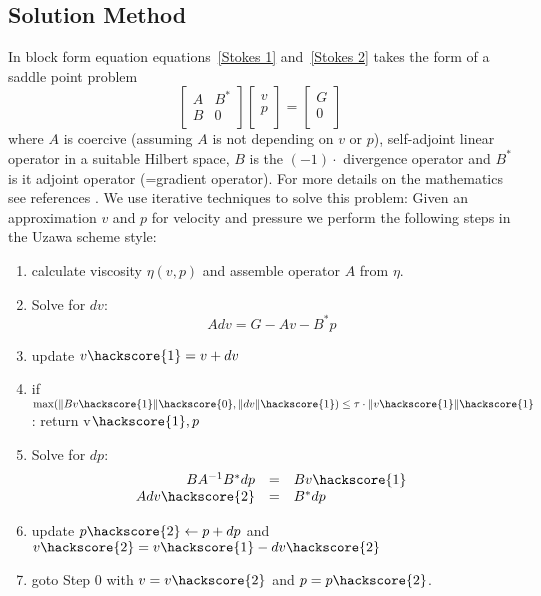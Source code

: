 \subsection{Solution Method \label{STOKES SOLVE}}
In block form equation equations~\ref{Stokes 1} and~\ref{Stokes 2} takes the form of a saddle point problem
\begin{equation}
\left[ \begin{array}{cc}
A     & B^{*} \\
B & 0 \\
\end{array} \right]
\left[ \begin{array}{c}
v \\
p \\
\end{array} \right]
=\left[ \begin{array}{c}
G \\
0 \\
\end{array} \right]
\label{SADDLEPOINT}
\end{equation}
where $A$ is coercive (assuming $A$ is not depending on $v$ or $p$), self-adjoint linear operator in a suitable Hilbert space, $B$ is the $(-1) \cdot$ divergence operator and $B^{*}$ is it adjoint operator (=gradient operator). For more details on the mathematics see references \cite{AAMIRBERKYAN2008,MBENZI2005}. 
We use iterative techniques to solve this problem: Given an approximation $v$ and $p$ for 
velocity and pressure we perform the following steps in the Uzawa scheme  style:
\begin{enumerate}
 \item calculate viscosity $\eta(v,p)$ and assemble operator $A$ from $\eta$.
 \item Solve for $dv$:
 \begin{equation}
 A dv = G - A v - B^{*} p  \label{SADDLEPOINT ITER STEP 1}
\end{equation}
 \item update $v\hackscore{1}= v+ dv$
 \item if $\max(\|Bv\hackscore{1}\|\hackscore{0},\|dv\|\hackscore{1}) \le \tau \cdot \|v\hackscore{1}\|\hackscore{1}$: return v$\hackscore{1},p$ 
 \item Solve for $dp$:
 \begin{equation}
 \begin{array}{rcl}
 B A^{-1} B^{*} dp & = & Bv\hackscore{1} \\
 A dv\hackscore{2} & = & B^{*} dp 
\end{array}
 \label{SADDLEPOINT ITER STEP 2}
 \end{equation}
 \item update $p\hackscore{2}\leftarrow p+ dp$ and $v\hackscore{2}= v\hackscore{1} - dv\hackscore{2}$
 \item goto Step 0 with $v=v\hackscore{2}$ and $p=p\hackscore{2}$.
\end{enumerate}
